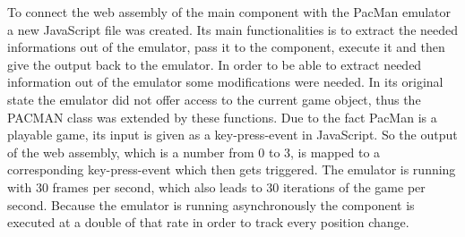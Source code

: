To connect the web assembly of the main component with the PacMan emulator a new JavaScript file was created. Its main functionalities is to extract the needed informations out of the emulator, pass it to the component, execute it and then give the output back to the emulator. In order to be able to extract needed information out of the emulator some modifications were needed. In its original state the emulator did not offer access to the current game object, thus the PACMAN class was extended by these functions. Due to the fact PacMan is a playable game, its input is given as a key-press-event in JavaScript. So the output of the web assembly, which is a number from 0 to 3, is mapped to a corresponding key-press-event which then gets triggered. The emulator is running with 30 frames per second, which also leads to 30 iterations of the game per second. Because the emulator is running asynchronously the component is executed at a double of that rate in order to track every position change.

